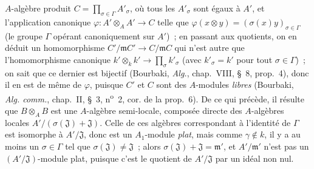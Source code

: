 \begin{env}[11.7.1]
$A$-algèbre produit $C=\prod_{\sigma\in\Gamma}A'_{\sigma}$, où tous les
$A'_{\sigma}$ sont égaux à $A'$, et l'application canonique
$\varphi:A'\otimes_A A'\to C$ telle que
$\varphi(x\otimes y)=(\sigma(x)y)_{\sigma\in\Gamma}$ (le groupe $\Gamma$
opérant canoniquement sur $A'$)~; en passant aux quotients, on en déduit un
homomorphisme $C'/\mathfrak m C'\to C/\mathfrak m C$ qui n'est autre que
l'homomorphisme canonique
$k'\otimes_k k'\to\prod_{\sigma}k'_{\sigma}$ (avec $k'_{\sigma}=k'$ pour tout
$\sigma\in\Gamma$)~; on sait que ce dernier est bijectif (Bourbaki,
\emph{Alg.}, chap.~VIII, \S~8, prop.~4), donc il en est de même de $\varphi$,
puisque $C'$ et $C$ sont des $A$-modules \emph{libres} (Bourbaki,
\emph{Alg. comm.}, chap.~II, \S~3, n\textsuperscript{o}~2, cor. de la prop.~6). De ce qui
précède, il résulte que $B\otimes_A B$ est une $A$-algèbre semi-locale, composée
directe des $A$-algèbres locales $A'/(\sigma(\mathfrak J)+\mathfrak J)$. Celle
de ces algèbres correspondant à l'identité de $\Gamma$ est isomorphe à
$A'/\mathfrak J$, donc est un $A_1$-module \emph{plat}, mais comme $\gamma\notin k$, il
y a au moins un $\sigma\in\Gamma$ tel que
$\sigma(\mathfrak J)\ne\mathfrak J$~; alors
$\sigma(\mathfrak J)+\mathfrak J=\mathfrak m'$, et $A'/\mathfrak m'$ n'est pas
un $(A'/\mathfrak J)$-module plat, puisque c'est le quotient de
$A'/\mathfrak J$ par un idéal non nul.
\end{env}

